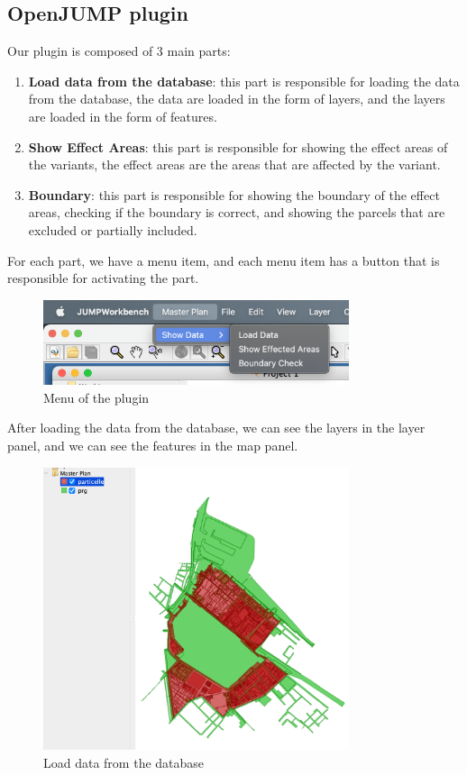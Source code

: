 \subsection{OpenJUMP plugin}\label{subsec:fa-openjump-plugin}
Our plugin is composed of 3 main parts:
\begin{enumerate}
    \item \textbf{Load data from the database}: this part is responsible for loading the data from the database, the data are loaded in the form of layers, and the layers are loaded in the form of features.
    \item \textbf{Show Effect Areas}: this part is responsible for showing the effect areas of the variants, the effect areas are the areas that are affected by the variant.
    \item \textbf{Boundary}: this part is responsible for showing the boundary of the effect areas, checking if the boundary is correct, and showing the parcels that are excluded or partially included.
\end{enumerate}

For each part, we have a menu item, and each menu item has a button that is responsible for activating the part.
\begin{figure}[H]
    \centering
    \includegraphics[width=0.8\textwidth]{res/plugin/01-menu}
    \caption{Menu of the plugin}
    \label{fig:pl-menu}
\end{figure}

After loading the data from the database, we can see the layers in the layer panel, and we can see the features in the map panel.
\begin{figure}[H]
    \centering
    \includegraphics[width=0.8\textwidth]{res/plugin/02-load-data}
    \caption{Load data from the database}
    \label{fig:pl-load-data}
\end{figure}


